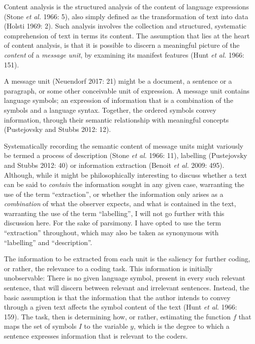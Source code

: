 \documentclass[12pt,twoside]{reedthesis}
\begin{document}
Content analysis is the structured analysis of the content of language
expressions (Stone \emph{et al.} 1966: 5), also simply defined as the
transformation of text into data (Holsti 1969: 2). Such analysis
involves the collection and structured, systematic comprehension of text
in terms its content. The assumption that lies at the heart of content
analysis, is that it is possible to discern a meaningful picture of the
\emph{content} of a \emph{message unit}, by examining its manifest
features (Hunt \emph{et al.} 1966: 151).

A message unit (Neuendorf 2017: 21) might be a document, a sentence or a
paragraph, or some other conceivable unit of expression. A message unit
contains language symbols; an expression of information that is a
combination of the symbols and a language syntax. Together, the ordered
symbols convey information, through their semantic relationship with
meaningful concepts (Pustejovsky and Stubbs 2012: 12).

Systematically recording the semantic content of message units might
variously be termed a process of description (Stone \emph{et al.} 1966:
11), labelling (Pustejovsky and Stubbs 2012: 40) or information
extraction (Benoit \emph{et al.} 2009: 495). Although, while it might be
philosophically interesting to discuss whether a text can be said to
\emph{contain} the information sought in any given case, warranting the
use of the term ``extraction'', or whether the information only arises
as a \emph{combination} of what the observer expects, and what is
contained in the text, warranting the use of the term ``labelling'', I
will not go further with this discussion here. For the sake of
parsimony. I have opted to use the term ``extraction'' throughout, which
may also be taken as synonymous with ``labelling'' and ``description''.

The information to be extracted from each unit is the saliency for
further coding, or rather, the relevance to a coding task. This
information is initially unobservable: There is no given language
symbol, present in every such relevant sentence, that will discern
between relevant and irrelevant sentences. Instead, the basic assumption
is that the information that the author intends to convey through a
given text affects the symbol content of the text (Hunt \emph{et al.}
1966: 159). The task, then is determining how, or rather, estimating the
function \(f\) that maps the set of symbols \(I\) to the variable \(y\),
which is the degree to which a sentence expresses information that is
relevant to the coders.
\end{document}
